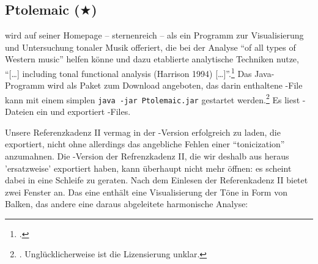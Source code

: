 %
%
%




\subsection{Ptolemaic ($\bigstar$)}

\label{Ptolemaic} wird auf seiner Homepage -- sternenreich -- als
ein Programm zur Visualisierung und Untersuchung tonaler Musik offeriert, die
bei der Analyse \enquote{of all types of Western music} helfen könne und dazu
etablierte analytische Techniken nutze, \enquote{[\ldots] including tonal
functional analysis (Harrison 1994) [\ldots]}.\footcite[vgl.][\nopage
wp]{Ptolemaic2016a} Das Java-Programm wird als Paket zum Download angeboten, das
darin enthaltene -File kann mit einem simplen \texttt{java -jar
Ptolemaic.jar} gestartet werden.\footnote{\cite[vgl.][\nopage
wp]{Ptolemaic2016b}. Unglücklicherweise ist die Lizensierung unklar.} Es liest
-Dateien ein und exportiert -Files.

Unsere Referenzkadenz II vermag  in der -Version
erfolgreich zu laden, die  exportiert, nicht ohne allerdings das
angebliche Fehlen einer \enquote{tonicization} anzumahnen. Die
-Version der Refrenzkadenz II, die wir deshalb aus 
heraus 'ersatzweise' exportiert haben, kann  überhaupt nicht mehr
öffnen: es scheint dabei in eine Schleife zu geraten. Nach dem Einlesen der
Referenkadenz II bietet  zwei Fenster an. Das eine enthält eine
Visualisierung der Töne in Form von Balken, das andere eine daraus abgeleitete
harmonische Analyse:

